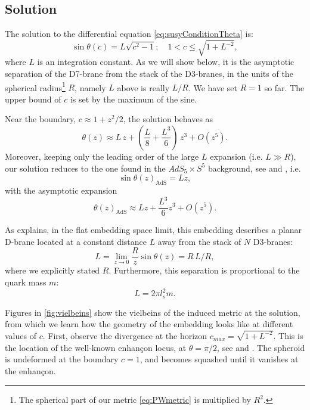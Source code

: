 \subsection{Solution}\label{sec:solution}

The solution to the differential equation \eqref{eq:susyConditionTheta} is:
\begin{equation}\label{eq:susyConditionSolution}
\boxed{\sin\theta(c) = L \sqrt{c^2-1}; \quad 1 < c \leq \sqrt{1+L^{-2}}},
\end{equation}
where $L$ is an integration constant. As we will show below, it is the asymptotic separation of the D7-brane from the stack of the D3-branes, in the units of the spherical radius\footnote{The spherical part of our metric \eqref{eq:PWmetric} is multiplied by $R^2$.} $R$, namely $L$ above is really $ L/R$.
We have set $R=1$ so far. The upper bound of $c$ is set by the maximum of the sine.


Near the boundary, $c \approx 1 + z^2/2$, the solution behaves as
\begin{equation} \label{eq:thetaExpanded}
 \theta(z) \approx L \, z + \left(\frac{L}{8} +\frac{L^3}{6} \right) \, z^3 + O(z^5).
\end{equation} 
Moreover, keeping only the leading order of the large $L$ expansion (i.e. $L\gg R$), our solution reduces to the one found in the $AdS_5 \times S^5$ background, see \cite{Karch:2002sh} and \cite{Karch:2005ms}, i.e.
\begin{equation}
 \sin\theta(z)_\text{AdS} = L z,
\end{equation}
with the asymptotic expansion
\begin{equation}
\theta(z)_\text{AdS} \approx L z + \frac{L^3}{6} z^3 + O(z^5).
\end{equation}



As \cite{Karch:2005ms} explains, in the flat embedding space limit, this embedding describes a planar D-brane located at a constant distance $L$ away from the stack of $N$ D3-branes:
\begin{equation}
 L = \lim_{z \rightarrow 0 } \frac{R}{z} \sin\theta(z) = R \, L/R,
\end{equation}
where we explicitly stated $R$. Furthermore, this separation is proportional to the quark mass $m$:
\begin{equation}
 L = 2 \pi l_s^2 m.
\end{equation}


Figures in \ref{fig:vielbeins} show the vielbeins of the induced metric at the solution, from which we learn how the geometry of the embedding looks like at different values of $c$. First, observe the divergence at the horizon $c_{max}=\sqrt{1+L^{-2}}$. This is the location of the well-known enhançon locus, at $\theta = \pi/2$, see \cite{Buchel:2000cn} and \cite{Evans:2000ct}. The spheroid is undeformed at the boundary $c=1$, and becomes squashed until it vanishes at the enhançon. 

